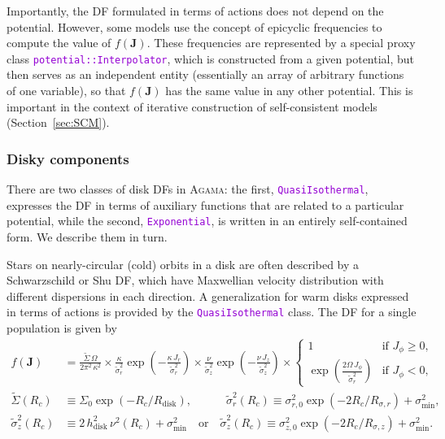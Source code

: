 \documentclass[12pt]{article}
\newcommand{\Agama}{\textsc{Agama}\xspace}
\newcommand{\ttt}[1]{\textcolor{darkviolet}{\texttt{#1}}}
\newcommand{\bJ}{\boldsymbol{J}}
\begin{document}
Importantly, the DF formulated in terms of actions does not depend on the potential. However, some models use the concept of epicyclic frequencies to compute the value of $f(\bJ)$. These frequencies are represented by a special proxy class \ttt{potential::Interpolator}, which is constructed from a given potential, but then serves as an independent entity (essentially an array of arbitrary functions of one variable), so that $f(\bJ)$ has the same value in any other potential. This is important in the context of iterative construction of self-consistent models (Section~\ref{sec:SCM}).


\subsubsection{Disky components}  \label{sec:DFdisk}

There are two classes of disk DFs in \Agama: the first, \ttt{QuasiIsothermal}, expresses the DF in terms of auxiliary functions that are related to a particular potential, while the second, \ttt{Exponential}, is written in an entirely self-contained form. We describe them in turn.

Stars on nearly-circular (cold) orbits in a disk are often described by a Schwarzschild or Shu DF, which have Maxwellian velocity distribution with different dispersions in each direction. A generalization for warm disks \cite{Dehnen1999} expressed in terms of actions \cite{BinneyMcMillan2011} is provided by the \ttt{QuasiIsothermal} class. The DF for a single population is given by
\begin{align*}
f(\bJ) &= \frac{\tilde\Sigma\,\Omega}{2\pi^2\,\kappa^2} \times
\frac{\kappa}{\tilde\sigma_r^2} \exp\left(-\frac{\kappa\,J_r}{\tilde\sigma_r^2}\right) \times
\frac{\nu}   {\tilde\sigma_z^2} \exp\left(-\frac{\nu\,   J_z}{\tilde\sigma_z^2}\right) \times
\left\{ \begin{array}{ll}  1 & \mbox{if }J_\phi\ge 0, \\
\exp\left( \frac{2\Omega\,J_\phi}{\tilde\sigma_r^2} \right) & \mbox{if }J_\phi<0, \end{array} \right. \\
\tilde\Sigma(R_c)  &\equiv \Sigma_0 \exp( -R_c / R_\mathrm{disk} ) , \qquad\quad
\tilde\sigma_r^2(R_c) \equiv \sigma_{r,0}^2 \exp( -2R_c / R_{\sigma,r} ) + \sigma_\mathrm{min}^2,\\
\tilde\sigma_z^2(R_c)&\equiv 2\,h_\mathrm{disk}^2\,\nu^2(R_c)  + \sigma_\mathrm{min}^2
\quad\mbox{or}\quad
\tilde\sigma_z^2(R_c) \equiv \sigma_{z,0}^2 \exp( -2R_c / R_{\sigma,z} )  + \sigma_\mathrm{min}^2.
\end{align*}
\end{document}
